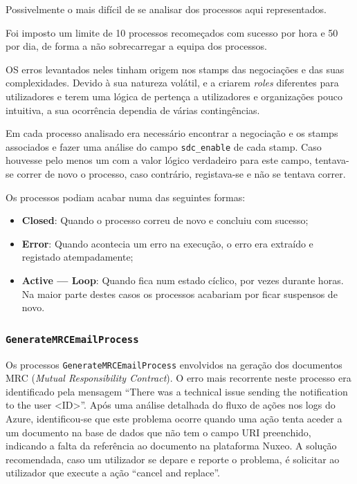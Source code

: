 
            Possivelmente o mais difícil de se analisar dos processos aqui representados.
            
            Foi imposto um limite de 10 processos recomeçados com sucesso por hora e 50 por dia, de forma a não sobrecarregar a equipa dos processos.

            OS erros levantados neles tinham origem nos stamps das negociações e das suas complexidades. Devido à sua natureza volátil, e a criarem \textit{roles} diferentes para utilizadores e terem uma lógica de pertença a utilizadores e organizações pouco intuitiva, a sua ocorrência dependia de várias contingências.

            Em cada processo analisado era necessário encontrar a negociação e os stamps associados e fazer uma análise do campo \texttt{sdc\_enable} de cada stamp. Caso houvesse pelo menos um com a valor lógico verdadeiro para este campo, tentava-se correr de novo o processo, caso contrário, registava-se e não se tentava correr.
             
            Os processos podiam acabar numa das seguintes formas:
            \begin{itemize}
                \item \textbf{Closed}: Quando o processo correu de novo e concluiu com sucesso;
                \item \textbf{Error}: Quando acontecia um erro na execução, o erro era extraído e registado atempadamente;
                \item \textbf{Active --- Loop}: Quando fica num estado cíclico, por vezes durante horas. Na maior parte destes casos os processos acabariam por ficar suspensos de novo.
            \end{itemize}

        \subsubsection{\texttt{GenerateMRCEmailProcess}}\label{secsec:generate_mrc_email_process}

            Os processos \texttt{GenerateMRCEmailProcess} envolvidos na geração dos documentos MRC (\textit{Mutual Responsibility Contract}). O erro mais recorrente neste processo era identificado pela mensagem ``There was a technical issue sending the notification to the user <ID>''. Após uma análise detalhada do fluxo de ações nos logs do Azure, identificou-se que este problema ocorre quando uma ação tenta aceder a um documento na base de dados que não tem o campo URI preenchido, indicando a falta da referência ao documento na plataforma Nuxeo. A solução recomendada, caso um utilizador se depare e reporte o problema, é solicitar ao utilizador que execute a ação ``cancel and replace''.

